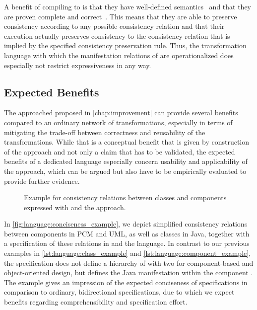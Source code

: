 A benefit of compiling to \reactions is that they have well-defined semantics~\cite[Sec.~6.7]{kramer2017a} and that they are proven complete and correct~\cite[Sec.~9.2.4 and~9.3]{kramer2017a}.
This means that they are able to preserve consistency according to any possible consistency relation and that their execution actually preserves consistency to the consistency relation that is implied by the specified consistency preservation rule.
Thus, the transformation language with which the manifestation relations of \commonalities are operationalized does especially not restrict expressiveness in any way.


\subsection{Expected Benefits}
\label{chap:language:commonalities:benefits}

The \commonalities approached proposed in \autoref{chap:improvement} can provide several benefits compared to an ordinary network of transformations, especially in terms of mitigating the trade-off between correctness and reusability of the transformations.
While that is a conceptual benefit that is given by construction of the approach and not only a claim that has to be validated, the expected benefits of a dedicated \commonalities language especially concern usability and applicability of the approach, which can be argued but also have to be empirically evaluated to provide further evidence.

\begin{figure}
    \centering
    
    \caption[Conciseness of \commonalities in comparison to \acrshort{QVTR}]{Example for consistency relations between classes and components expressed with \qvtr and the \commonalities approach.}
    \label{fig:language:conciseness_example}
\end{figure}

In \autoref{fig:language:conciseness_example}, we depict simplified consistency relations between components in \gls{PCM} and \gls{UML}, as well as classes in Java, together with a specification of these relations in \qvtr and the \commonalities language.
In contrast to our previous examples in \autoref{lst:language:class_example} and \autoref{lst:language:component_example}, the \commonalities specification does not define a hierarchy of \commonalities with two \conceptmetamodels for component-based and object-oriented design, but defines the Java manifestation within the component \commonality.
The example gives an impression of the expected conciseness of \commonalities specifications in comparison to ordinary, bidirectional specifications, due to which we expect benefits regarding comprehensibility and specification effort.

